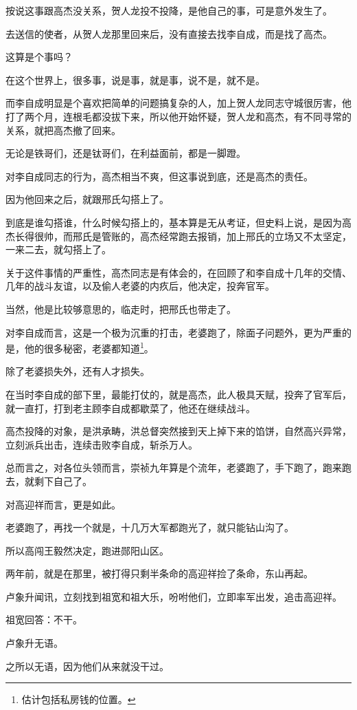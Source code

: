 \begin{multicols}{\theparacolNo}
按说这事跟高杰没关系，贺人龙投不投降，是他自己的事，可是意外发生了。

去送信的使者，从贺人龙那里回来后，没有直接去找李自成，而是找了高杰。

这算是个事吗？

在这个世界上，很多事，说是事，就是事，说不是，就不是。

而李自成明显是个喜欢把简单的问题搞复杂的人，加上贺人龙同志守城很厉害，他打了两个月，连根毛都没拔下来，所以他开始怀疑，贺人龙和高杰，有不同寻常的关系，就把高杰撤了回来。

无论是铁哥们，还是钛哥们，在利益面前，都是一脚蹬。

对李自成同志的行为，高杰相当不爽，但这事说到底，还是高杰的责任。

因为他回来之后，就跟邢氏勾搭上了。

到底是谁勾搭谁，什么时候勾搭上的，基本算是无从考证，但史料上说，是因为高杰长得很帅，而邢氏是管账的，高杰经常跑去报销，加上邢氏的立场又不太坚定，一来二去，就勾搭上了。

关于这件事情的严重性，高杰同志是有体会的，在回顾了和李自成十几年的交情、几年的战斗友谊，以及偷人老婆的内疚后，他决定，投奔官军。

当然，他是比较够意思的，临走时，把邢氏也带走了。

对李自成而言，这是一个极为沉重的打击，老婆跑了，除面子问题外，更为严重的是，他的很多秘密，老婆都知道\footnote{估计包括私房钱的位置。}。

除了老婆损失外，还有人才损失。

在当时李自成的部下里，最能打仗的，就是高杰，此人极具天赋，投奔了官军后，就一直打，打到老主顾李自成都歇菜了，他还在继续战斗。

高杰投降的对象，是洪承畴，洪总督突然接到天上掉下来的馅饼，自然高兴异常，立刻派兵出击，连续击败李自成，斩杀万人。

总而言之，对各位头领而言，崇祯九年算是个流年，老婆跑了，手下跑了，跑来跑去，就剩下自己了。

对高迎祥而言，更是如此。

老婆跑了，再找一个就是，十几万大军都跑光了，就只能钻山沟了。

所以高闯王毅然决定，跑进郧阳山区。

两年前，就是在那里，被打得只剩半条命的高迎祥捡了条命，东山再起。

卢象升闻讯，立刻找到祖宽和祖大乐，吩咐他们，立即率军出发，追击高迎祥。

祖宽回答：不干。

卢象升无语。

之所以无语，因为他们从来就没干过。


\end{multicols}
